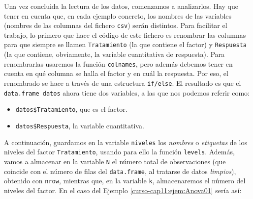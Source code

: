 \documentclass[10pt,a4paper]{article}\usepackage[]{graphicx}\usepackage[]{color}
\newcounter {cont01}
\begin{document}
Una vez concluida la lectura de los datos, comenzamos a analizarlos. Hay que tener en cuenta que, en cada ejemplo concreto, los nombres de las variables (nombres de las columnas del fichero {\tt csv}) serán distintos. Para facilitar el trabajo, lo primero que hace el código de este fichero es renombrar las columnas para que siempre se llamen {\tt Tratamiento} (la que contiene el factor) y {\tt Respuesta} (la que contiene, obviamente, la variable cuantitativa de respuesta). Para renombrarlas usaremos la función {\tt colnames}, pero además debemos tener en cuenta en qué columna se halla el factor y en cuál la respuesta. Por eso, el renombrado se hace a través de una estructura {\tt if/else}. El resultado es que el {\tt data.frame datos} ahora tiene dos variables, a las que nos podemos referir como:
\begin{itemize}
  \item {\verb#datos$Tratamiento#}, que es el factor.
  \item {\verb#datos$Respuesta#}, la variable cuantitativa.
\end{itemize}
A continuación, guardamos en la variable {\tt niveles} los {\em nombres} o {\em etiquetas} de los niveles del factor {\tt Tratamiento}, usando para ello la función {\tt levels}. Además, vamos a almacenar en la variable {\tt N} el número total de observaciones (que coincide con el número de filas del {\tt data.frame}, al tratarse de datos {\em limpios}), obtenido con {\tt nrow}, mientras que, en la variable {\tt k}, almacenaremos el número del niveles del factor. En el caso del Ejemplo \ref{curso-cap11:ejem:Anova01} sería así:
\end{document}
